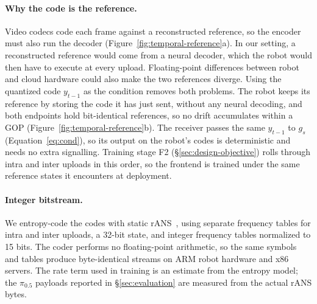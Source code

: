 \paragraph{Why the code is the reference.}
Video codecs code each frame against a reconstructed reference, so the
encoder must also run the decoder
(Figure~\ref{fig:temporal-reference}a). In our setting, a reconstructed
reference would come from a neural decoder, which the robot would then
have to execute at every upload. Floating-point differences between robot
and cloud hardware could also make the two references diverge. Using the
quantized code $y_{t-1}$ as the condition removes both problems. The robot keeps its reference by storing the
code it has just sent, without any neural decoding, and both endpoints
hold bit-identical references, so no drift accumulates within a GOP
(Figure~\ref{fig:temporal-reference}b).
The receiver passes the same $y_{t-1}$ to $g_s$
(Equation~\ref{eq:cond}), so its output on the robot's codes is
deterministic and needs no extra signalling.
Training stage F2 (\S\ref{sec:design-objective}) rolls through intra and
inter uploads in this order, so the frontend is trained under the same
reference states it encounters at deployment.

\paragraph{Integer bitstream.}
We entropy-code the codes with static rANS~\cite{ans}, using separate
frequency tables for intra and inter uploads, a 32-bit state, and integer
frequency tables normalized to 15 bits. The coder performs no floating-point arithmetic,
so the same symbols and tables produce byte-identical streams on ARM
robot hardware and x86 servers. The rate term used in training is an
estimate from the entropy model; the $\pi_{0.5}$ payloads reported in
\S\ref{sec:evaluation} are measured from the actual rANS bytes.


